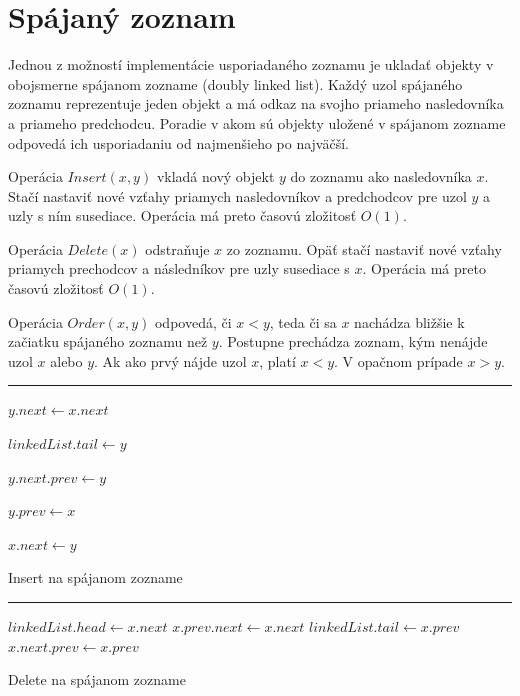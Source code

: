 \documentclass[
  digital,     %
  oneside,     %
  nosansbold,  %
  nocolorbold, %
  lof,         %
  lot,         %
]{fithesis4}
\begin{document}
\chapter{Spájaný zoznam}

Jednou z možností implementácie usporiadaného zoznamu je ukladať objekty v obojsmerne spájanom zozname (doubly linked list). Každý uzol spájaného zoznamu reprezentuje jeden objekt a má odkaz na svojho priameho nasledovníka a priameho predchodcu. Poradie v akom sú objekty uložené v spájanom zozname odpovedá ich usporiadaniu od najmenšieho po najväčší.

Operácia $Insert(x, y)$ vkladá nový objekt $y$ do zoznamu ako nasledovníka $x$. Stačí nastaviť nové vzťahy priamych nasledovníkov a predchodcov pre uzol $y$ a uzly s ním susediace. Operácia má preto časovú zložitosť $O(1)$.

Operácia $Delete(x)$ odstraňuje $x$ zo zoznamu. Opäť stačí nastaviť nové vzťahy priamych prechodcov a následníkov pre uzly susediace s $x$. Operácia má preto časovú zložitosť $O(1)$.

Operácia $Order(x, y)$ odpovedá, či $x < y$, teda či sa $x$ nachádza bližšie k začiatku spájaného zoznamu než $y$. Postupne prechádza zoznam, kým nenájde uzol $x$ alebo $y$. Ak ako prvý nájde uzol $x$, platí $x < y$. V opačnom prípade $x > y$.


\begin{algorithm}
\hrule\vspace{0.2em}
$y.next \leftarrow x.next$\;

{
    $linkedList.tail \leftarrow y$\;
}

\Else
{
    $y.next.prev \leftarrow y$\;
}

$y.prev \leftarrow x$\;

$x.next \leftarrow y$\;

\caption{Insert na spájanom zozname}
\end{algorithm}

\begin{algorithm}
\hrule\vspace{0.2em}
{
    $linkedList.head \leftarrow x.next$\;
}
\Else
{
    $x.prev.next \leftarrow x.next$\;
}
{
    $linkedList.tail \leftarrow x.prev$\;
}
\Else
{
    $x.next.prev \leftarrow x.prev$\;
}
\caption{Delete na spájanom zozname}
\end{algorithm}
\end{document}
